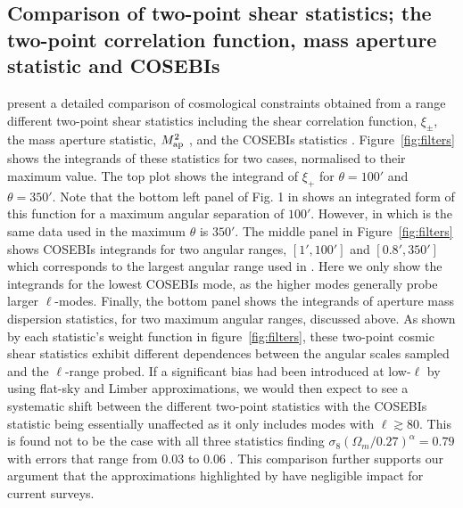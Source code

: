 \subsection{Comparison of two-point shear statistics; the two-point correlation function, mass aperture statistic and COSEBIs}
\citet{kilbinger/etal:2013} present a detailed comparison of cosmological constraints obtained from a range different two-point shear statistics including the shear correlation function, $\xi_\pm$, the mass aperture statistic, $M_ {\rm ap}^2$ \citep{schneider/etal:1998}, and the COSEBIs statistics \citep{schneider/etal:2010}.  Figure~\ref{fig:filters} shows the integrands of these statistics for two cases,
normalised to their maximum value.
The top plot shows the integrand of $\xi_+$ for $\theta=100'$ and $\theta=350'$. 
Note that the bottom left panel of Fig. 1 in \citet{kitching/etal:2016} shows an integrated form of this function for a maximum
angular separation of $100'$. However, in \citet{kilbinger/etal:2013} which is the same data used in \citet{kitching/etal:2016} 
the maximum $\theta$ is $350'$. The middle panel in Figure~\ref{fig:filters} shows COSEBIs integrands for two angular ranges,
$[1',100']$ and $[0.8',350']$ which corresponds to the largest angular range used in \citet{kilbinger/etal:2013}. Here we only show the integrands for the lowest COSEBIs mode, as the higher modes generally probe larger $\ell$-modes.
Finally, the bottom panel shows the integrands of aperture mass dispersion statistics, for two maximum angular ranges, discussed above. 
As shown by each statistic's weight function in figure~\ref{fig:filters}, these two-point cosmic shear statistics exhibit different dependences between the angular scales sampled and the $\ell$-range probed.   
If a significant bias had been introduced at low-$\ell$ by using flat-sky and Limber approximations, we would then expect to see a systematic shift between the different two-point statistics with the COSEBIs statistic being essentially unaffected as it only includes modes with $\ell \gtrsim 80$.  This is found not to be the case with all three statistics finding $\sigma_8 (\Omega_m/0.27)^\alpha = 0.79$ with errors that range from $0.03$ to $0.06$ \citep[see Table 5 of][]{kilbinger/etal:2013}.  This comparison further supports our argument that the approximations highlighted by \citet{kitching/etal:2016} have negligible impact for current surveys.

